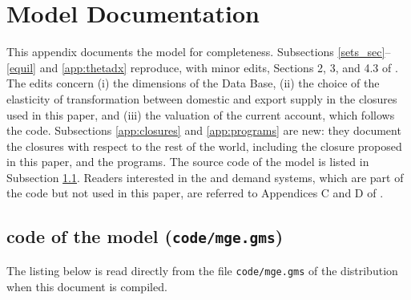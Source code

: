 \section{Model Documentation}\label{app:model}

This appendix documents the \GTAPtwelve model for completeness.
Subsections \ref{sets_sec}--\ref{equil} and \ref{app:thetadx} reproduce, with minor edits, Sections 2, 3, and 4.3 of \citet{LanzRutherford2016}.
The edits concern (i) the dimensions of the  Data Base, (ii) the choice of the elasticity of transformation between domestic and export supply in the closures used in this paper, and (iii) the valuation of the current account, which follows the \GAMS code.
Subsections \ref{app:closures} and \ref{app:programs} are new: they document the closures with respect to the rest of the world, including the \SATE closure proposed in this paper, and the programs.
The \MPSGE source code of the model is listed in Subsection \ref{app:code}.
Readers interested in the \LES and \CDE demand systems, which are part of the code but not used in this paper, are referred to Appendices C and D of \citet{LanzRutherford2016}.






\subsection[Code]{\MPSGE code of the model (\texttt{code/mge.gms})}\label{app:code}

The listing below is read directly from the file \texttt{code/mge.gms} of the distribution when this document is compiled.

